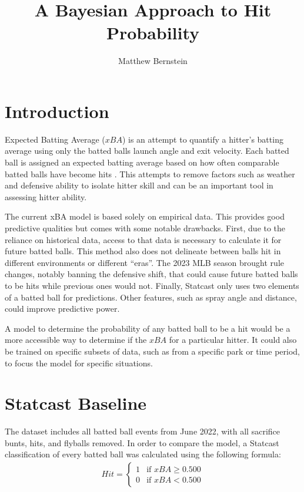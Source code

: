 \documentclass[12pt,letterpaper]{article}
\title{A Bayesian Approach to Hit Probability}
\author{Matthew Bernstein}
\begin{document}
\maketitle

\section*{Introduction}
Expected Batting Average ($xBA$) is an attempt to quantify a hitter’s batting average using only the batted balls launch angle and exit velocity. Each batted ball is assigned an expected batting average based on how often comparable batted balls have become hits . This attempts to remove factors such as weather and defensive ability to isolate hitter skill and can be an important tool in assessing hitter ability.

The current xBA model is based solely on empirical data. This provides good predictive qualities but comes with some notable drawbacks. First, due to the reliance on historical data, access to that data is necessary to calculate it for future batted balls. This method also does not delineate between balls hit in different environments or different “eras”. The 2023 MLB season brought rule changes, notably banning the defensive shift, that could cause future batted balls to be hits while previous ones would not. Finally, Statcast only uses two elements of a batted ball for predictions. Other features, such as spray angle and distance, could improve predictive power. 

A model to determine the probability of any batted ball to be a hit would be a more accessible way to determine if the $xBA$ for a particular hitter. It could also be trained on specific subsets of data, such as from a specific park or time period, to focus the model for specific situations. 

\section*{Statcast Baseline}
The dataset includes all batted ball events from June 2022, with all sacrifice bunts, hits, and flyballs removed. In order to compare the model, a Statcast classification of every batted ball was calculated using the following formula:
\begin{align*}
    Hit =
        \begin{cases}
            1 & \text{if } xBA \ge 0.500\\
            0 & \text{if } xBA < 0.500
        \end{cases}
\end{align*}
\end{document}

